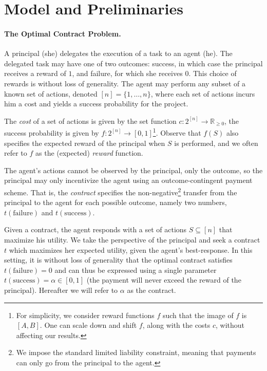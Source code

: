\documentclass[11pt]{article}
\newcommand{\reals}{\mathbb{R}}
\begin{document}
\section{Model and Preliminaries}\label{sec:model}

\paragraph{The Optimal Contract Problem.}
A principal (she) delegates the execution of a task to an agent (he).
The delegated task may have one of two outcomes: success, in which case the principal receives a reward of $1$, and failure, for which she receives $0$. This choice of rewards is without loss of generality. 
The agent may perform any subset of a known set of actions, denoted $[n] = \{1, \ldots, n\}$, where each set of actions incurs him a cost and yields a success probability for the project.

The \emph{cost} of a set of actions is given by the set function $c:2^{[n]} \to \reals_{\ge 0}$, the success probability is given by $f:2^{[n]} \to [0,1]$\footnote{For simplicity, we consider reward functions $f$ such that the image of $f$ is $[A,B]$. One can scale down and shift $f$, 
along with the costs $c$, without affecting our results.}.
Observe that $f(S)$ also specifies the expected reward of the principal when $S$ is performed, and we often refer to $f$ as the (expected) \emph{reward} function. 

The agent's actions cannot be observed by the principal, only the outcome, so the principal may only incentivize the agent using an outcome-contingent payment scheme.
That is, the \emph{contract} specifies the non-negative\footnote{We impose the standard limited liability constraint, meaning that payments can only go from the principal to the agent.} 
transfer from the principal to the agent for each possible outcome, namely two numbers, $t(\text{failure})$ and $t(\text{success})$.

Given a contract, the agent responds with a set of actions $S \subseteq [n]$ that maximize his utility.
We take the perspective of the principal and seek a contract $t$ which maximizes her expected utility, given the agent's best-response.
In this setting, it is without loss of generality that the optimal contract satisfies $t(\text{failure})=0$ \cite{dutting2022combinatorial} and can thus be expressed using a single parameter $t(\text{success}) = \alpha \in [0,1]$ (the payment will never exceed the reward of the principal). 
Hereafter we will refer to $\alpha$ as the contract.
\end{document}
